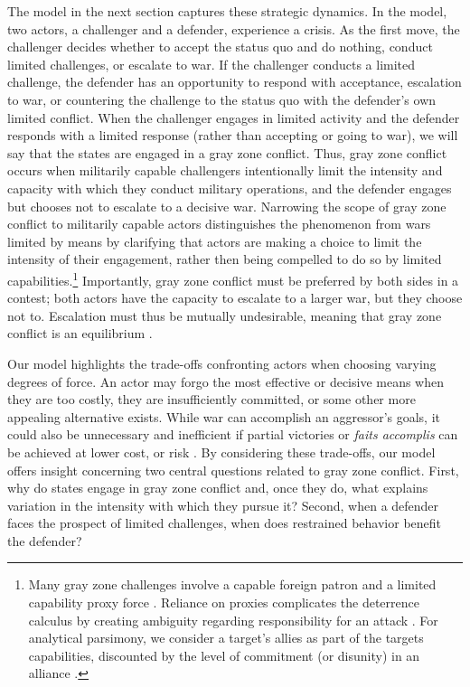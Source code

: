 \documentclass[11pt,letterpaper,pdftex,dvipsnames,table]{article}
\begin{document}
The model in the next section captures these strategic dynamics. In the model, two actors, a challenger and a defender, experience a crisis. As the first move, the challenger decides whether to accept the status quo and do nothing, conduct limited challenges, or escalate to war. If the challenger conducts a limited challenge, the defender has an opportunity to respond with acceptance, escalation to war, or countering the challenge to the status quo with the defender's own limited conflict. When the challenger engages in limited activity and the defender responds with a limited response (rather than accepting or going to war), we will say that the states are engaged in a gray zone conflict. Thus, gray zone conflict occurs when militarily capable challengers intentionally limit the intensity and capacity with which they conduct military operations, and the defender engages but chooses not to escalate to a decisive war. Narrowing the scope of gray zone conflict to militarily capable actors distinguishes the phenomenon from wars limited by means by clarifying that actors are making a choice to limit the intensity of their engagement, rather then being compelled to do so by limited capabilities.\footnote{Many gray zone challenges involve a capable foreign patron and a limited capability proxy force \citep{plana_proxywarleast_2020}. Reliance on proxies complicates the deterrence calculus by creating ambiguity regarding responsibility for an attack \citep{danilovic_sourcesthreatcredibility_2001, borghard_logiccoercioncyberspace_2017, orourke_covertregimechange_2018}. For analytical parsimony, we consider a target's allies as part of the targets capabilities, discounted by the level of commitment (or disunity) in an alliance \citep{quackenbush_notonlywhether_2006, sobek_memyselfallies_2013}.} Importantly, gray zone conflict must be preferred by both sides in a contest; both actors have the capacity to escalate to a larger war, but they choose not to. Escalation must thus be mutually undesirable, meaning that gray zone conflict is an equilibrium \citep{carson_facingsavingface_2016, carson_secretwarscovert_2018}.

Our model highlights the trade-offs confronting actors when choosing varying degrees of force. An actor may forgo the most effective or decisive means when they are too costly, they are insufficiently committed, or some other more appealing alternative exists. While war can accomplish an aggressor’s goals, it could also be unnecessary and inefficient if partial victories or \textit{faits accomplis} can be achieved at lower cost, or risk \citep{altman_advancingattackingstrategic_2018}. By considering these trade-offs, our model offers insight concerning two central questions related to gray zone conflict. First, why do states engage in gray zone conflict and, once they do, what explains variation in the intensity with which they pursue it? Second, when a defender faces the prospect of limited challenges, when does restrained behavior benefit the defender?
\end{document}
